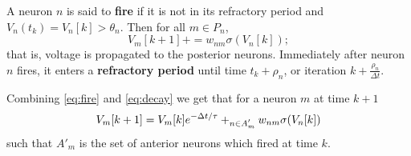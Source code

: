 \begin{definition}\label{fire}
	A neuron $n$ is said to \textbf{fire} if it is not in its refractory period and $V_n(t_{k}) = V_n[k] > \theta_n$. Then for all $m \in P_n$,
	\begin{equation}
		V_m[k+1] += w_{nm} \sigma(V_n[k]); \label{eq:fire}
	\end{equation}
	that is, voltage is propagated to the posterior neurons. 	Immediately after neuron $n$ fires, it enters  a \textbf{refractory period} until time $t_{k} + \rho_n$, or iteration $k + \frac{\rho_n}{\Delta t}$.
\end{definition}


Combining \eqref{eq:fire} and \eqref{eq:decay} we get that for a neuron $m$ at time $k+1$
\begin{equation}
	V_m[k+1] = V_m[k]e^{-\Delta  t/\tau} + \relax_{\substack{n \in A'_m}} w_{nm} \sigma(V_n[k])
\end{equation}
such that $A'_m$ is the set of anterior neurons which fired at time $k.$
